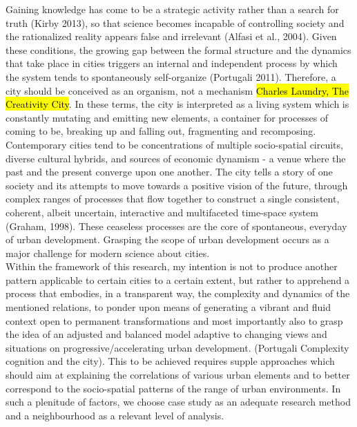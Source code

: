 \documentclass[11pt]{report}
\begin{document}
Gaining knowledge has come to be a strategic activity rather than a search for truth (Kirby 2013), so that science becomes incapable of controlling society and the rationalized reality appears false and irrelevant (Alfasi et al., 2004). Given these conditions, the growing gap between the formal structure and the dynamics that take place in cities triggers an internal and independent process by which the system tends to spontaneously self-organize (Portugali 2011). Therefore, a city should be conceived as an organism, not a mechanism \hl{Charles Laundry, The Creativity City}. In these terms, the city is interpreted as a living system which is constantly mutating and emitting new elements, a container for processes of coming to be, breaking up and falling out, fragmenting and recomposing. Contemporary cities tend to be concentrations of multiple socio-spatial circuits, diverse cultural hybrids, and sources of economic dynamism - a venue where the past and the present converge upon one another. The city tells a story of one society and its attempts to move towards a positive vision of the future, through complex ranges of processes that flow together to construct a single consistent, coherent, albeit uncertain, interactive and multifaceted time-space system (Graham, 1998). These ceaseless processes are the core of spontaneous, everyday of urban development. Grasping the scope of urban development occurs as a major challenge for modern science about cities.
\\
Within the framework of this research, my intention is not to produce another pattern applicable to certain cities to a certain extent, but rather to apprehend a process that embodies, in a transparent way, the complexity and dynamics of the mentioned relations, to ponder upon means of generating a vibrant and fluid context open to permanent transformations and most importantly also to grasp the idea of an adjusted and balanced model adaptive to changing views and situations on progressive/accelerating urban development. (Portugali Complexity cognition and the city). This to be achieved requires supple approaches which should aim at explaining the correlations of various urban elements and to better correspond to the socio-spatial patterns of the range of urban environments. In such a plenitude of factors, we choose case study as an adequate research method and a neighbourhood as a relevant level of analysis.
\\
\end{document}
